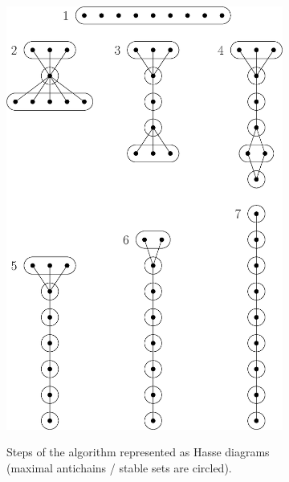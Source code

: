 \begin{figure} \centering \begin{subfigure}[b]{0.4\textwidth}
{\includegraphics[width=\textwidth]{fig/supi/quicksort}} \caption{Steps of the
\quicksort algorithm represented as Hasse diagrams (maximal antichains / stable
sets are circled).} \label{fig:supi:quicksort} \end{subfigure}
\begin{subfigure}[b]{0.4\textwidth}

\end{subfigure}
\end{figure}
